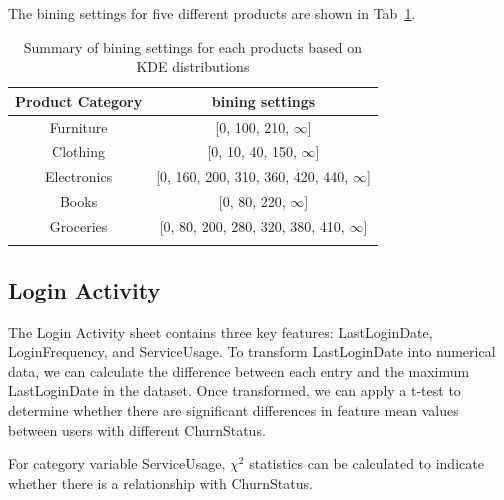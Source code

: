 \documentclass[journal=gmj]{CUP-JNL-DTM}%
\theoremstyle{definition}
\numberwithin{equation}{section}
\begin{document}
The bining settings for five different products are shown in Tab~\ref{tab:bining_summary}.

\begin{table}[h]
    \centering
    \begin{tabular}{c|c}
        \hline
        \textbf{Product Category} & \textbf{bining settings} \\
        \hline
        Furniture &  [0, 100, 210, $\infty$] \\
        \hline
        Clothing &  [0, 10, 40, 150, $\infty$] \\
        \hline
        Electronics &  [0, 160, 200, 310, 360, 420, 440, $\infty$] \\
        \hline
        Books &  [0, 80, 220, $\infty$] \\
        \hline
        Groceries & [0, 80, 200, 280, 320, 380, 410, $\infty$]  \\
        \hline \\
    \end{tabular}
    \caption{Summary of bining settings for each products based on KDE distributions}
    \label{tab:bining_summary}
\end{table}


\subsection{Login Activity}
The Login Activity sheet contains three key features: LastLoginDate, LoginFrequency, and ServiceUsage. To transform LastLoginDate into numerical data, we can calculate the difference between each entry and the maximum LastLoginDate in the dataset. Once transformed, we can apply a t-test to determine whether there are significant differences in feature mean values between users with different ChurnStatus.

For category variable ServiceUsage, $\chi^2$ statistics can be calculated to indicate whether there is a relationship with ChurnStatus.
\end{document}
